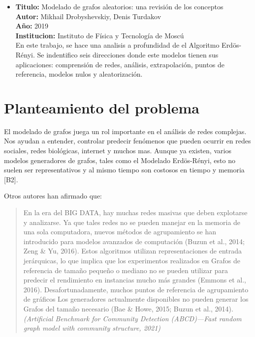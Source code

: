 \documentclass[11pt]{extarticle}
\begin{document}
\begin{itemize}
  \item \textbf{Titulo:} Modelado de grafos aleatorios: una revisión de los conceptos\\
  \textbf{Autor:} Mikhail Drobyshevskiy, Denis Turdakov\\
  \textbf{A\~no:} 2019\\
  \textbf{Institucion:} Instituto de Física y Tecnología de Moscú\\
  En este trabajo, se hace una analisis a profundidad de el Algoritmo Erdös-Rényi.
  Se indentifico seis direcciones donde este modelos tienen sus aplicaciones: comprensión de redes, análisis, extrapolación, puntos de referencia, modelos nulos y aleatorización. 

\end{itemize}



\section{Planteamiento del problema}
  El modelado de grafos juega un rol importante en el an\'alisis de redes complejas. 
  Nos ayudan a entender, controlar predecir fen\'omenos que pueden ocurrir en redes sociales, 
  redes biol\'ogicas, internet y muchos mas. Aunque ya existen, varios modelos generadores de grafos, tales como el Modelado  Erdös-Rényi, esto no suelen ser representativos
  y al mismo tiempo son costosos en tiempo y memoria [B2].\hfill\break

  Otros autores han afirmado que:
  \begin{quote}
    \begin{footnotesize}
    En la era del BIG DATA, hay muchas redes masivas que deben explotarse y analizarse. Ya que
    tales redes no se pueden manejar en la memoria de una sola computadora, nuevos métodos de agrupamiento
    se han introducido para modelos avanzados de computación (Buzun et al., 2014; Zeng \& Yu, 2016).
    Estos algoritmos utilizan representaciones de entrada jerárquicas, lo que implica que los experimentos realizados en Grafos de referencia de tamaño pequeño o mediano no se pueden utilizar para predecir el rendimiento en instancias mucho más grandes (Emmons et al., 2016). Desafortunadamente, muchos puntos de referencia de agrupamiento de gráficos
    Los generadores actualmente disponibles no pueden generar los Grafos del tamaño necesario (Bae \& Howe,
    2015; Buzun et al., 2014).
  \textit{ (Artificial Benchmark for Community Detection (ABCD)—Fast random graph model with community structure, 2021)}
    \end{footnotesize}
  \end{quote}
\end{document}
